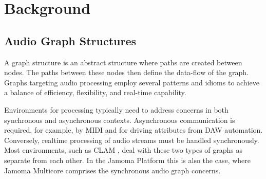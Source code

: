 \documentclass[twoside,a4paper]{article}
\begin{document}

%
%  
%





\section{Background} %



\subsection{Audio Graph Structures} %

A graph structure is an abstract structure where paths are created between nodes. %
 The paths between these nodes then define the data-flow of the graph.  Graphs targeting audio processing employ several patterns and idioms to achieve a balance of efficiency, flexibility, and real-time capability.

Environments for processing typically need to address concerns in both synchronous and asynchronous contexts.  Asynchronous communication is required, for example, by MIDI and for driving attributes from DAW automation.  Conversely, realtime processing of audio streams must be handled synchronously.  Most environments, such as CLAM  \cite{Amatraian:2007}, deal with these two types of graphs as separate from each other.  In the Jamoma Platform this is also the case, where Jamoma Multicore comprises the synchronous audio graph concerns.

\end{document}
